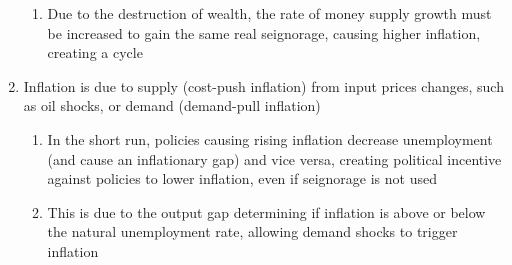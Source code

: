 \begin{enumerate}
\begin{enumerate}
\item Due to the destruction of wealth, the rate of money supply growth must be increased to gain the same real seignorage, causing higher inflation, creating a cycle
\end{enumerate}
\item Inflation is due to supply (cost-push inflation) from input prices changes, such as oil shocks, or demand (demand-pull inflation)
\begin{enumerate}
\item In the short run, policies causing rising inflation decrease unemployment (and cause an inflationary gap) and vice versa, creating political incentive against policies to lower inflation, even if seignorage is not used
\item This is due to the output gap determining if inflation is above or below the natural unemployment rate, allowing demand shocks to trigger inflation
\end{enumerate}
\end{enumerate}

